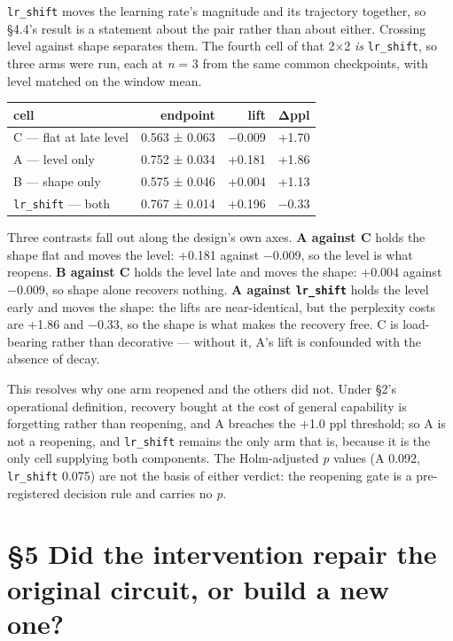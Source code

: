 \documentclass[11pt]{article}
\begin{document}
\texttt{lr\_shift} moves the learning rate's magnitude and its trajectory together, so §4.4's result
is a statement about the pair rather than about either. Crossing level against shape
separates them. The fourth cell of that 2×2 \emph{is} \texttt{lr\_shift}, so three arms were run, each at
\emph{n} = 3 from the same common checkpoints, with level matched on the window mean.

\begin{table}[t]
\centering\small
\begin{tabular}{@{}lrrr@{}}
\toprule\noalign{}
cell & endpoint & lift & Δppl \\
\midrule\noalign{}

C --- flat at late level & 0.563 ± 0.063 & −0.009 & +1.70 \\
A --- level only & 0.752 ± 0.034 & +0.181 & +1.86 \\
B --- shape only & 0.575 ± 0.046 & +0.004 & +1.13 \\
\texttt{lr\_shift} --- both & 0.767 ± 0.014 & +0.196 & −0.33 \\
\bottomrule
\end{tabular}
\end{table}


Three contrasts fall out along the design's own axes. \textbf{A against C} holds the shape flat
and moves the level: +0.181 against −0.009, so the level is what reopens. \textbf{B against C}
holds the level late and moves the shape: +0.004 against −0.009, so shape alone recovers
nothing. \textbf{A against \texttt{lr\_shift}} holds the level early and moves the shape: the lifts are
near-identical, but the perplexity costs are +1.86 and −0.33, so the shape is what makes the
recovery free. C is load-bearing rather than decorative --- without it, A's lift is confounded
with the absence of decay.

This resolves why one arm reopened and the others did not. Under §2's operational definition,
recovery bought at the cost of general capability is forgetting rather than reopening, and A
breaches the +1.0 ppl threshold; so A is not a reopening, and \texttt{lr\_shift} remains the only arm
that is, because it is the only cell supplying both components. The Holm-adjusted \emph{p} values
(A 0.092, \texttt{lr\_shift} 0.075) are not the basis of either verdict: the reopening gate is a
pre-registered decision rule and carries no \emph{p}.

\section{§5 Did the intervention repair the original circuit, or build a new one?}\label{did-the-intervention-repair-the-original-circuit-or-build-a-new-one}
\end{document}
